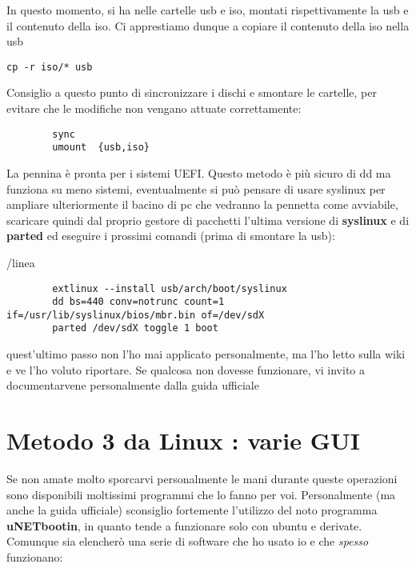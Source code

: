 \documentclass[twoside,italian]{book}
\newcommand{\code}[1]{\texttt{#1}}
\newcommand{\centcode}[1]{

\definecolor{codice}{rgb}{0.5,0.1,0.1}

	\begin{center}
		\color{codice}
		\code{#1}
	\end{center}


}
\begin{document}
			In questo momento, si ha nelle cartelle usb e iso, montati rispettivamente la usb e il contenuto della iso. Ci apprestiamo dunque a copiare il contenuto della iso nella usb

			\centcode{cp -r iso/* usb}

			Consiglio a questo punto di sincronizzare  i dischi e smontare le cartelle, per evitare che le modifiche non vengano attuate correttamente:

\begin{lstlisting}
		sync
		umount  {usb,iso}
\end{lstlisting}



			La pennina è pronta per i sistemi UEFI. Questo metodo è più sicuro di dd ma funziona su meno sistemi, eventualmente si può pensare di usare syslinux per ampliare ulteriormente il bacino di pc che vedranno la pennetta come avviabile, scaricare quindi dal proprio gestore di pacchetti l'ultima versione di \textbf{syslinux} e di \textbf{parted} ed eseguire i prossimi comandi (prima di smontare la usb):

/linea
\begin{lstlisting}
		extlinux --install usb/arch/boot/syslinux
		dd bs=440 conv=notrunc count=1 if=/usr/lib/syslinux/bios/mbr.bin of=/dev/sdX
		parted /dev/sdX toggle 1 boot
\end{lstlisting}



			\begin{tcolorbox}[floatplacement=b,width=\textwidth,colback={white},title={ATTENZIONE:},colbacktitle=red,coltitle=white,colupper=red]

				quest'ultimo passo non l'ho mai applicato personalmente, ma l'ho letto sulla wiki e ve l'ho voluto riportare. Se qualcosa non dovesse funzionare, vi invito  a documentarvene personalmente dalla guida ufficiale

			\end{tcolorbox}


		\section{Metodo 3 da Linux : varie GUI}
			Se non amate molto sporcarvi personalmente le mani durante queste operazioni sono disponibili moltissimi programmi che lo fanno per voi. Personalmente (ma anche la guida ufficiale) sconsiglio fortemente l'utilizzo del noto programma \textbf{uNETbootin}, in quanto tende a funzionare solo con ubuntu e derivate. Comunque sia elencherò una serie di software che ho usato io e che \textit{spesso} funzionano:
\end{document}
